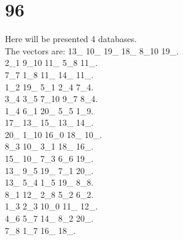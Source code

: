 \chapter{96}
\indent Here will be presented 4 databases.\\
The vectors are:
13\_ 10\_ 19\_ 18\_ 8\_10 19\_.\\2\_1 9\_10 11\_ 5\_8 11\_.\\7\_7 1\_8 11\_ 14\_ 11\_.\\1\_2 19\_ 5\_1 2\_4 7\_4.\\3\_4 3\_5 7\_10 9\_7 8\_4.\\1\_4 6\_1 20\_ 5\_5 1\_9.\\17\_ 13\_ 15\_ 13\_ 14\_.\\20\_ 1\_10 16\_0 18\_ 10\_.\\8\_3 10\_ 3\_1 18\_ 16\_.\\15\_ 10\_ 7\_3 6\_6 19\_.\\13\_ 9\_5 19\_ 7\_1 20\_.\\13\_ 5\_4 1\_5 19\_ 8\_8.\\8\_1 12\_ 2\_8 5\_2 6\_2.\\1\_3 2\_3 10\_0 11\_ 12\_.\\4\_6 5\_7 14\_ 8\_2 20\_.\\7\_8 1\_7 16\_ 18\_.\\